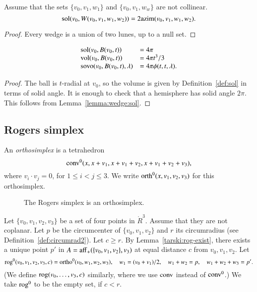 \begin{lemma} 
Assume that the sets $\{v_0,v_1,w_1\}$ and
$\{v_0,v_1,w_w\}$ are not collinear. 
$$\operatorname{sol}(v_0,W(v_0,v_1,w_1,w_2)) = 2{\operatorname{azim}}(v_0,v_1,w_1,w_2).$$
\end{lemma}    

\begin{proof} Every wedge is a union of two lunes, up to a null set.
\end{proof}

\begin{lemma}  
   $$
   \begin{array}{lll}
    {\operatorname{sol}}(v_0,B(v_0,t)) &= 4\pi\\
    {\operatorname{vol}}(v_0,B(v_0,t)) &= 4\pi t^3/3\\
    {\operatorname{sovo}}(v_0,B(v_0,t),\lambda) &= 4 \pi \phi(t,t,\lambda).
   \end{array}
   $$
\end{lemma}

\begin{proof}
The ball is $t$-radial at $v_0$, so the volume is given by
Definition~\ref{def:sol} in terms of solid angle.  It is enough
to check that a hemisphere has solid angle $2\pi$.  This follows
from Lemma~\ref{lemma:wedge:sol}.
\end{proof}  




\subsection{Rogers simplex}

\begin{definition} 
An {\it orthosimplex} is a tetrahedron
    $${\operatorname{conv}}^0(x,x+v_1,x+v_1+v_2,x+v_1+v_2+v_3),$$
where $v_i\cdot v_j=0$, for $1\le i<j\le 3$.   We write
${\operatorname{orth}}^0(x,v_1,v_2,v_3)$ for this orthosimplex.
\end{definition}

\begin{figure}[htb]
  \centering
  \caption{The Rogers simplex is an orthosimplex.}
\end{figure}


\begin{definition} 
Let $\{v_0,v_1,v_2,v_3\}$ be a set of four points in $\ring{R}^3$.
Assume that they are not coplanar.  Let $p$ be the circumcenter
of $\{v_0,v_1,v_2\}$ and $r$ its circumradius (see Definition~\ref{def:circumrad2}).  Let $c\ge r$.
By Lemma~\ref{tarski:rog-exist}, there exists a unique
point $p'$ in $A={\operatorname{aff}}_+(\{v_0,v_1,v_2\},v_3)$ at equal distance $c$
from $v_0,v_1,v_2$.
Let $$
    {\operatorname{rog}}^0(v_0,v_1,v_2,v_3,c) = 
    {\operatorname{ortho}}^0(v_0,w_1,w_2,w_3),
    \quad w_1=(v_0+v_1)/2,\quad w_1+w_2=p,\quad w_1+w_2+w_3=p'.
    $$
(We define ${\operatorname{rog}}(v_0,\ldots,v_3,c)$ similarly, where we use
${\operatorname{conv}}$ instead of ${\operatorname{conv}}^0$.)
We take ${\operatorname{rog}}^0$ to be the empty set, if $c< r$.
\end{definition}

